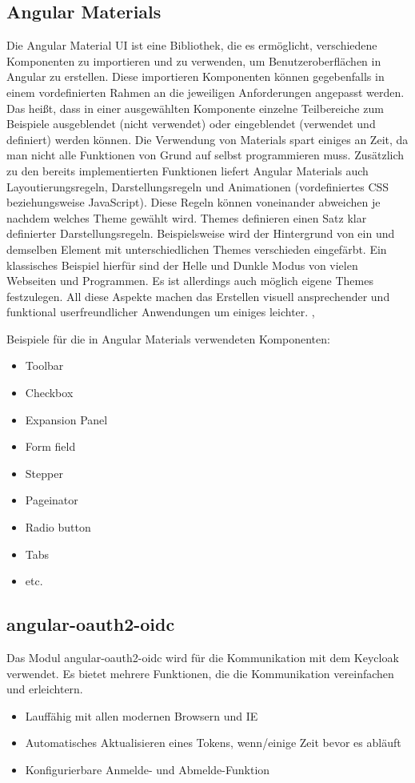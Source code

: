 \subsection{Angular Materials}
\label{chap:materials}
Die Angular Material UI ist eine Bibliothek, die es ermöglicht, verschiedene Komponenten zu importieren
und zu verwenden, um Benutzeroberflächen in Angular zu erstellen. Diese importieren Komponenten können gegebenfalls in einem vordefinierten 
Rahmen an die jeweiligen Anforderungen angepasst werden. Das heißt, dass in einer ausgewählten Komponente 
einzelne Teilbereiche zum Beispiele ausgeblendet (nicht verwendet) oder eingeblendet 
(verwendet und definiert) werden können. Die Verwendung von Materials spart einiges an Zeit, 
da man nicht alle Funktionen von Grund auf selbst programmieren muss. Zusätzlich zu den bereits implementierten
Funktionen liefert Angular Materials auch Layoutierungsregeln, Darstellungsregeln und Animationen (vordefiniertes CSS beziehungsweise JavaScript).
Diese Regeln können voneinander abweichen je nachdem welches Theme gewählt wird.
\newline
\newline
Themes definieren einen Satz klar definierter Darstellungsregeln. Beispielsweise wird der Hintergrund von ein und demselben Element
mit unterschiedlichen Themes verschieden eingefärbt. Ein klassisches Beispiel hierfür sind der Helle und Dunkle Modus
von vielen Webseiten und Programmen. Es ist allerdings auch möglich eigene Themes festzulegen.
All diese Aspekte machen das Erstellen visuell ansprechender und funktional 
userfreundlicher Anwendungen um einiges leichter. \cite{noauthor_angular_nodate-1}, \cite{noauthor_official_2022}

Beispiele für die in Angular Materials verwendeten Komponenten:
\begin{itemize}
  \item Toolbar
  \item Checkbox
  \item Expansion Panel
  \item Form field
  \item Stepper
  \item Pageinator
  \item Radio button
  \item Tabs
  \item etc. \cite{noauthor_name_nodate}
\end{itemize}

\subsection{angular-oauth2-oidc}
Das Modul angular-oauth2-oidc wird für die Kommunikation mit dem Keycloak verwendet. Es bietet 
mehrere Funktionen, die die Kommunikation vereinfachen und erleichtern. \cite{noauthor_angular-oauth2-oidc_nodate}
\begin{itemize}
  \item Lauffähig mit allen modernen Browsern und IE
  \item Automatisches Aktualisieren eines Tokens, wenn/einige Zeit bevor es abläuft
  \item Konfigurierbare Anmelde- und Abmelde-Funktion
\end{itemize}

